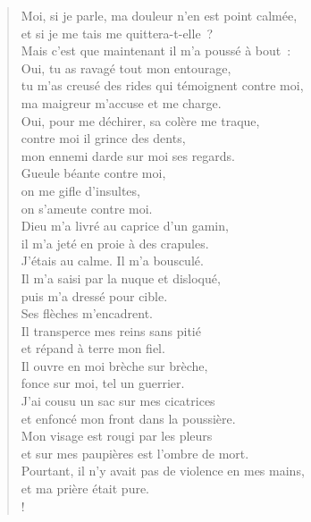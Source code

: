 \documentclass[french,twoside]{book} %
\def\mednobreak{\ifdim\lastskip<\medskipamount
  \removelastskip\nopagebreak\medskip\fi}
\newcommand{\labelblock}[1]{\medbreak{\noindent\color{rubric}\bfseries #1}\par\mednobreak}
\begin{document}
\begin{verse}
Moi, si je parle, ma douleur n’en est point calmée, \\
et si je me tais me quittera-t-elle ?\\
Mais c’est que maintenant il m’a poussé à bout : \\
Oui, tu as ravagé tout mon entourage,\\
tu m’as creusé des rides qui témoignent contre moi, \\
ma maigreur m’accuse et me charge.\\
Oui, pour me déchirer, sa colère me traque, \\
contre moi il grince des dents, \\
mon ennemi darde sur moi ses regards.\\
Gueule béante contre moi, \\
on me gifle d’insultes, \\
on s’ameute contre moi.\\
Dieu m’a livré au caprice d’un gamin, \\
il m’a jeté en proie à des crapules.\\
J’étais au calme. Il m’a bousculé. \\
Il m’a saisi par la nuque et disloqué, \\
puis m’a dressé pour cible.\\
Ses flèches m’encadrent. \\
Il transperce mes reins sans pitié \\
et répand à terre mon fiel.\\
Il ouvre en moi brèche sur brèche, \\
fonce sur moi, tel un guerrier.\\
J’ai cousu un sac sur mes cicatrices \\
et enfoncé mon front dans la poussière.\\
Mon visage est rougi par les pleurs \\
et sur mes paupières est l’ombre de mort.\\
Pourtant, il n’y avait pas de violence en mes mains, \\
et ma prière était pure.\\!
\end{verse}

\labelblock{Le témoin du crime}
\end{document}
